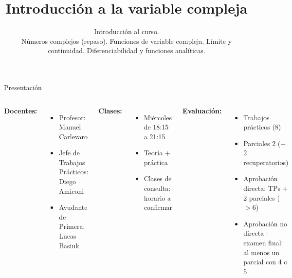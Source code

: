\documentclass[9pt, aspectratio=169]{beamer}
\title{Introducción a la variable compleja}
\subtitle{Introducción al curso.\\ Números complejos (repaso). Funciones de variable compleja. Límite y continuidad. Diferenciabilidad y funciones analíticas.}
\begin{document}
\maketitle

\begin{frame}{ Presentación }
    \begin{columns}[t]
    \cx
    \textbf{Docentes:}
    \begin{itemize}
    \item Profesor: Manuel Carlevaro
    \item Jefe de Trabajos Prácticos: Diego Amiconi
    \item Ayudante de Primera: Lucas Basiuk
    \end{itemize}
    \vspace{1em}

    \textbf{Clases:}
    \begin{itemize}
    \item Miércoles de 18:15 a 21:15
    \item Teoría + práctica
    \item Clases de consulta: horario a confirmar
    \end{itemize}
    \cx
    \textbf{Evaluación:}
    \begin{itemize}
    \item Trabajos prácticos (8)
    \item Parciales 2 (+ 2 recuperatorios)
    \item Aprobación directa: TPs + 2 parciales ($> 6$)
    \item Aprobación no directa - examen final: al menos un parcial con 4 o 5 
    \end{itemize}
    \end{columns}
\end{frame}
\end{document}
